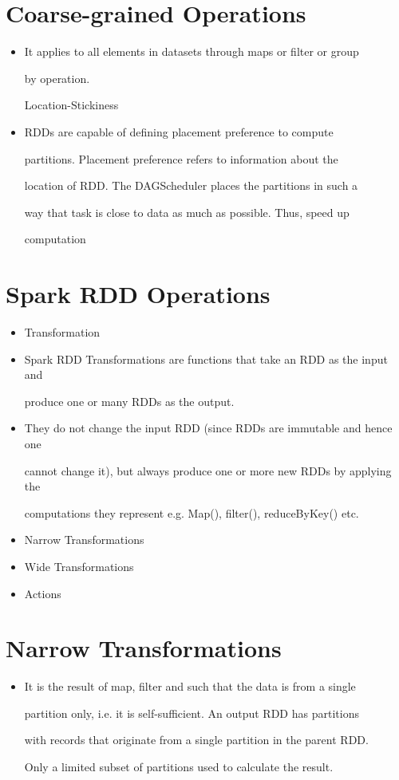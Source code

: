 \documentclass[12pt, openany]{book}
\begin{document}
\section{Coarse-grained Operations}
\begin{itemize}[leftmargin=*]\item It applies to all elements in datasets through maps or filter or group

by operation.


Location-Stickiness

\item RDDs are capable of defining placement preference to compute

partitions. Placement preference refers to information about the


location of RDD. The DAGScheduler places the partitions in such a


way that task is close to data as much as possible. Thus, speed up


computation
\end{itemize}

\section{Spark RDD Operations}
\begin{itemize}[leftmargin=*]\item Transformation
\item Spark RDD Transformations are functions that take an RDD as the input and

produce one or many RDDs as the output.

\item They do not change the input RDD (since RDDs are immutable and hence one

cannot change it), but always produce one or more new RDDs by applying the


computations they represent e.g. Map(), filter(), reduceByKey() etc.

\item Narrow Transformations
\item Wide Transformations
\item Actions\end{itemize}

\section{Narrow Transformations}
\begin{itemize}[leftmargin=*]\item It is the result of map, filter and such that the data is from a single

partition only, i.e. it is self-sufficient. An output RDD has partitions


with records that originate from a single partition in the parent RDD.


Only a limited subset of partitions used to calculate the result.
\end{itemize}
\end{document}
